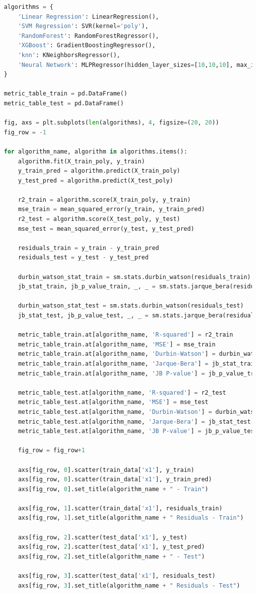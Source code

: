 \begin{lstlisting}[language=Python, caption={Defining and Running Regression Models}]
algorithms = {
    'Linear Regression': LinearRegression(),
    'SVM Regression': SVR(kernel='poly'),
    'RandomForest': RandomForestRegressor(),
    'XGBoost': GradientBoostingRegressor(),
    'knn': KNeighborsRegressor(),
    'Neural Network': MLPRegressor(hidden_layer_sizes=[10,10,10], max_iter=20000)
}

metric_table_train = pd.DataFrame()
metric_table_test = pd.DataFrame()

fig, axs = plt.subplots(len(algorithms), 4, figsize=(20, 20))
fig_row = -1

for algorithm_name, algorithm in algorithms.items():
    algorithm.fit(X_train_poly, y_train)
    y_train_pred = algorithm.predict(X_train_poly)
    y_test_pred = algorithm.predict(X_test_poly)

    r2_train = algorithm.score(X_train_poly, y_train)
    mse_train = mean_squared_error(y_train, y_train_pred)
    r2_test = algorithm.score(X_test_poly, y_test)
    mse_test = mean_squared_error(y_test, y_test_pred)

    residuals_train = y_train - y_train_pred
    residuals_test = y_test - y_test_pred

    durbin_watson_stat_train = sm.stats.durbin_watson(residuals_train)
    jb_stat_train, jb_p_value_train, _, _ = sm.stats.jarque_bera(residuals_train)
    
    durbin_watson_stat_test = sm.stats.durbin_watson(residuals_test)
    jb_stat_test, jb_p_value_test, _, _ = sm.stats.jarque_bera(residuals_test)

    metric_table_train.at[algorithm_name, 'R-squared'] = r2_train
    metric_table_train.at[algorithm_name, 'MSE'] = mse_train
    metric_table_train.at[algorithm_name, 'Durbin-Watson'] = durbin_watson_stat_train
    metric_table_train.at[algorithm_name, 'Jarque-Bera'] = jb_stat_train
    metric_table_train.at[algorithm_name, 'JB P-value'] = jb_p_value_train

    metric_table_test.at[algorithm_name, 'R-squared'] = r2_test
    metric_table_test.at[algorithm_name, 'MSE'] = mse_test
    metric_table_test.at[algorithm_name, 'Durbin-Watson'] = durbin_watson_stat_test
    metric_table_test.at[algorithm_name, 'Jarque-Bera'] = jb_stat_test
    metric_table_test.at[algorithm_name, 'JB P-value'] = jb_p_value_test

    fig_row = fig_row+1
    
    axs[fig_row, 0].scatter(train_data['x1'], y_train)
    axs[fig_row, 0].scatter(train_data['x1'], y_train_pred)
    axs[fig_row, 0].set_title(algorithm_name + " - Train")
    
    axs[fig_row, 1].scatter(train_data['x1'], residuals_train)
    axs[fig_row, 1].set_title(algorithm_name + " Residuals - Train")
    
    axs[fig_row, 2].scatter(test_data['x1'], y_test)
    axs[fig_row, 2].scatter(test_data['x1'], y_test_pred)
    axs[fig_row, 2].set_title(algorithm_name + " - Test")
    
    axs[fig_row, 3].scatter(test_data['x1'], residuals_test)
    axs[fig_row, 3].set_title(algorithm_name + " Residuals - Test")
\end{lstlisting}
